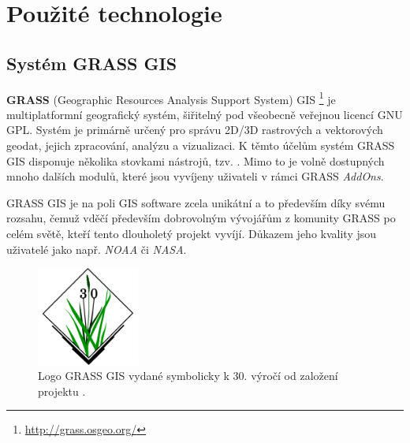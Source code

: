 \documentclass[a4paper,12pt,oneside]{report}
\begin{document}
\setcounter{footnote}{1}



\newpage
\setcounter{footnote}{1}
\section{Použité technologie}

\subsection{Systém GRASS GIS}
\textbf{GRASS} (Geographic Resources Analysis Support System) GIS
\footnote{\url{http://grass.osgeo.org/}} je multiplatformní
geografický systém, šiřitelný pod všeobecně veřejnou licencí \acs{GNU
  GPL}. Systém je primárně určený pro správu 2D/3D rastrových a
vektorových geodat, jejich zpracování, analýzu a vizualizaci. K těmto
účelům systém GRASS GIS disponuje několika stovkami nástrojů,
tzv. .  Mimo to je volně dostupných mnoho dalších modulů,
které jsou vyvíjeny uživateli v rámci GRASS \textit{AddOns}.

GRASS GIS je na poli GIS software zcela unikátní a to především díky
svému rozsahu, čemuž vděčí především dobrovolným vývojářům z komunity
GRASS po celém světě, kteří tento dlouholetý projekt vyvíjí. Důkazem jeho
kvality jsou uživatelé jako např.
\textit{NOAA} či %
\textit{NASA}.%

\begin{figure}[h!]
    \centering
    \includegraphics[width=0.3\textwidth]{./img/grass/grasslogo.png}
    \caption[Logo GRASS]{\centering Logo GRASS GIS vydané symbolicky k 30. výročí od založení projektu \footnotemark. }
 \end{figure}   
\end{document}
